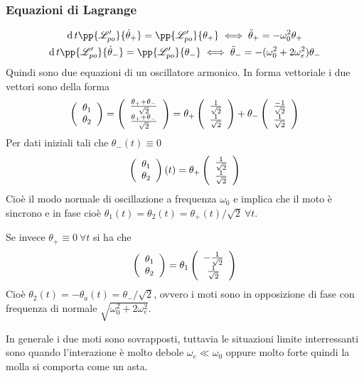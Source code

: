 \documentclass[Main.tex]{subfiles}
\begin{document}
\begin{tema}
	\subsubsection*{Equazioni di Lagrange}
	\begin{gather}
		\dd{}{t} \pp{\L'_{po}}{\dot \theta_+} = \pp{\L'_{po}}{\theta_+} \iff \ddot \theta_+ = - \omega_0^2 \theta_+\\
		\dd{}{t} \pp{\L'_{po}}{\dot \theta_-} = \pp{\L'_{po}}{\theta_-} \iff \ddot \theta_- = - (\omega_0^2 + 2\omega_e^2) \theta_-
	\end{gather}
	Quindi sono due equazioni di un oscillatore armonico. In forma vettoriale i due vettori sono della forma
	\begin{gather}
		\vec{\theta_1 \\ \theta_2} = \vec{ \frac{\theta_+ + \theta_- }{\sqrt{2}} \\ \frac{\theta_+ + \theta_-}{\sqrt{2}}} = \theta_+ \vec{ \frac{1}{\sqrt{2}} \\ \frac{1}{\sqrt{2}}} + \theta_- \vec{ \frac{-1}{\sqrt{2}} \\ \frac{1}{\sqrt{2}}}
	\end{gather}
	Per dati iniziali tali che $\theta_-(t) \equiv 0 $
	\begin{gather}
		\vec{\theta_1 \\ \theta_2} (t) = \theta_+ \vec{\frac{1}{\sqrt{2}} \\ \frac{1}{\sqrt{2}}} 
	\end{gather}
	Cioè il modo normale di oscillazione a frequenza $\omega_0$ e implica che il moto è sincrono e in fase cioè $\theta_1(t) = \theta_2(t) = \theta_+ (t)/ \sqrt{2} \ \forall t $. 
	
	Se invece $\theta_+ \equiv 0  \ \forall t $ si ha che 
	\begin{gather}
		\vec{\theta_1 \\ \theta_2} = \theta_1 \vec{- \frac{1}{\sqrt{2}} \\ \frac{1}{\sqrt{2}} }
	\end{gather}
	Cioè $\theta_2(t) = - \theta_a(t) = \theta_-/ \sqrt{2} $, ovvero i moti sono in opposizione di fase con frequenza di normale $\sqrt{\omega_0^2 + 2\omega_e^2}$. 
	
	In generale i due moti sono sovrapposti, tuttavia le situazioni limite interressanti sono quando l'interazione è molto debole $\omega_e \ll \omega_0$ oppure molto forte quindi la molla si comporta come un asta.
	
	
\end{tema}
\end{document}
